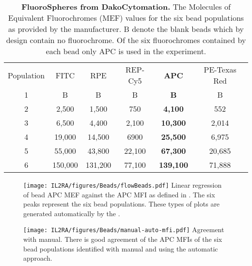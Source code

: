 \begin{table} [hb]
\begin{center}
\begin{tabular} {|c c c c c c|}
\cline{1-6}
Population  & FITC    & RPE     & REP-Cy5 & \textbf{APC}     & PE-Texas Red\\
\cline{1-6}
1           & B       & B       & B       & \textbf{B}       & B \\
2           & 2,500   & 1,500   & 750     & \textbf{4,100}   & 552\\
3           & 6,500   & 4,400   & 2,100   & \textbf{10,300}  & 2,014\\
4           & 19,000  & 14,500  & 6900    & \textbf{25,500}  & 6,975\\
5           & 55,000  & 43,800  & 22,100  & \textbf{67,300}  & 20,685\\
6           & 150,000 & 131,200 & 77,100  & \textbf{139,100} & 71,888\\
\cline{1-6}
\end{tabular}
\end{center}
\caption{
\label{table:fluorospheres}
\textbf{FluoroSpheres from DakoCytomation.}
The Molecules of Equivalent Fluorochromes (MEF) values for the six bead populations as provided by the manufacturer.
B denote the blank beads which by design contain no fluorochrome.
Of the six fluorochromes contained by each bead only APC is used in the experiment.
}
\end{table}

\begin{figure}[hb]
\centering
\texttt{[image: IL2RA/figures/Beads/flowBeads.pdf]}
{ Linear regression of bead APC MEF against the APC MFI as defined in .}
{
The six peaks represent the six bead populations.
These types of plots are generated automatically by the .
}
\end{figure}


\begin{figure}[hb]
\centering
\texttt{[image: IL2RA/figures/Beads/manual-auto-mfi.pdf]}
{ Agreement with manual.  }
{ There is good agreement of the APC MFIs of the six bead populations identified with manual and using the automatic approach. }
\end{figure}



